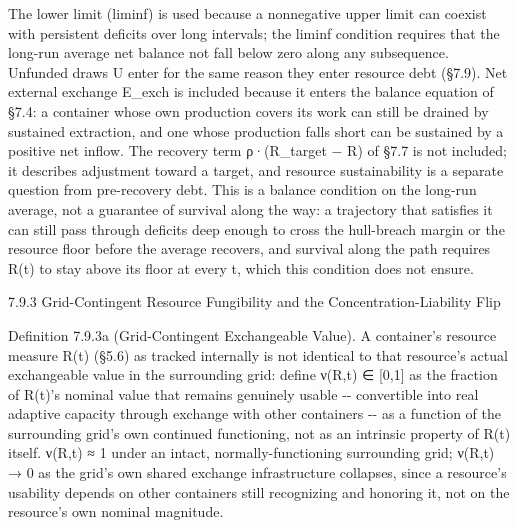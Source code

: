 \documentclass[
]{article}
\begin{document}
The lower limit (liminf) is used because a nonnegative upper limit can
coexist with persistent deficits over long intervals; the liminf
condition requires that the long-run average net balance not fall below
zero along any subsequence. Unfunded draws U enter for the same reason
they enter resource debt (§7.9). Net external exchange E\_exch is
included because it enters the balance equation of §7.4: a container
whose own production covers its work can still be drained by sustained
extraction, and one whose production falls short can be sustained by a
positive net inflow. The recovery term ρ·(R\_target − R) of §7.7 is not
included; it describes adjustment toward a target, and resource
sustainability is a separate question from pre-recovery debt. This is a
balance condition on the long-run average, not a guarantee of survival
along the way: a trajectory that satisfies it can still pass through
deficits deep enough to cross the hull-breach margin or the resource
floor before the average recovers, and survival along the path requires
R(t) to stay above its floor at every t, which this condition does not
ensure.

7.9.3 Grid-Contingent Resource Fungibility and the
Concentration-Liability Flip

Definition 7.9.3a (Grid-Contingent Exchangeable Value). A container's
resource measure R(t) (§5.6) as tracked internally is not identical to
that resource's actual exchangeable value in the surrounding grid:
define ν(R,t) ∈ {[}0,1{]} as the fraction of R(t)'s nominal value that
remains genuinely usable -\/- convertible into real adaptive capacity
through exchange with other containers -\/- as a function of the
surrounding grid's own continued functioning, not as an intrinsic
property of R(t) itself. ν(R,t) ≈ 1 under an intact,
normally-functioning surrounding grid; ν(R,t) → 0 as the grid's own
shared exchange infrastructure collapses, since a resource's usability
depends on other containers still recognizing and honoring it, not on
the resource's own nominal magnitude.
\end{document}
